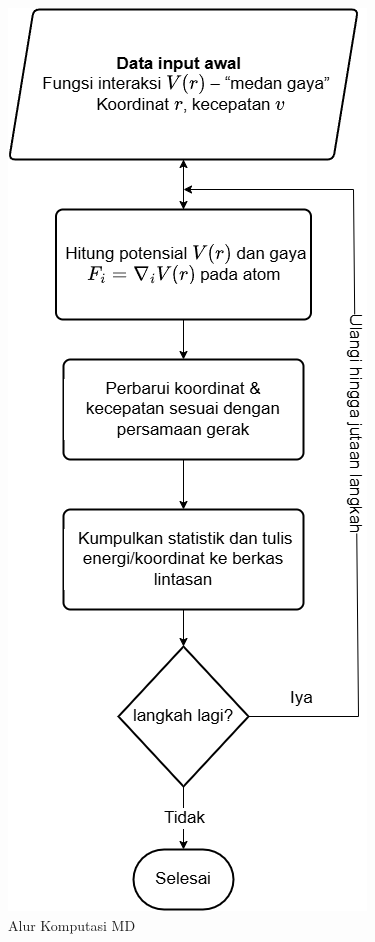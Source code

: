 \begin{figure}
    \centering
    \includegraphics[width=0.6\linewidth]{gambar/MD.drawio.png}
    \caption{Alur Komputasi MD}
    \label{Diagram Alir MD}
\end{figure}

